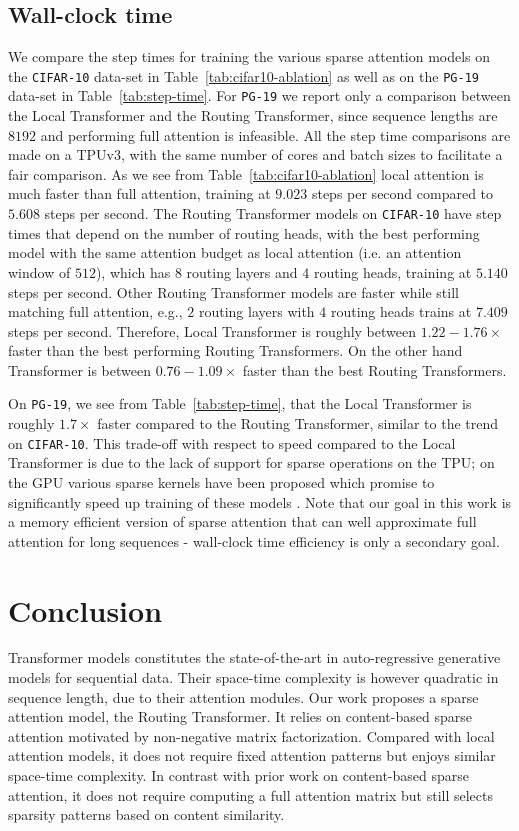 \subsection{Wall-clock time} We compare the step times for training the various sparse attention models on the \texttt{CIFAR-10} data-set in Table~\ref{tab:cifar10-ablation} as well as on the \texttt{PG-19} data-set in Table~\ref{tab:step-time}. For \texttt{PG-19}
we report only a comparison between the Local Transformer and the Routing Transformer, since sequence lengths are \(8192\) and performing full attention is infeasible. All the step time comparisons are made on a TPUv3, with the same number of cores and batch sizes to facilitate a fair comparison. As we see from Table~\ref{tab:cifar10-ablation} local attention is much faster than full attention, training at \(9.023\) steps per second compared to \(5.608\) steps per second. The Routing Transformer models on
\texttt{CIFAR-10} have step times that depend on the number of routing heads, with the best performing model with the same attention budget as local attention (i.e. an attention window of \(512\)), which has \(8\) routing layers and \(4\) routing heads, training at \(5.140\) steps per second. Other Routing Transformer models are faster while still matching full attention, e.g.,  \(2\) routing layers with \(4\) routing heads trains at \(7.409\) steps per second. Therefore, Local Transformer is roughly between \(1.22 - 1.76\times\) faster than the best performing Routing Transformers. On the other hand Transformer is between \(0.76 - 1.09\times\) faster than the best Routing Transformers.

On \texttt{PG-19}, we see from Table~\ref{tab:step-time}, that the Local Transformer is roughly \(1.7\times\) faster compared to the Routing Transformer, similar to the trend on \texttt{CIFAR-10}. 
This trade-off with respect to speed compared to the Local Transformer is due to the lack of support for sparse operations on the TPU; on the GPU various sparse kernels have been proposed which promise to significantly speed up training of these models \citep{gale2020sparse}. Note that our goal in this work is a memory efficient version of sparse attention that can well approximate full attention for long sequences - wall-clock time efficiency is only a secondary goal. 

\section{Conclusion}
Transformer models constitutes the state-of-the-art in auto-regressive generative models for sequential data. Their space-time complexity is however quadratic in sequence length, due to their attention modules. Our work proposes a sparse attention model, the Routing Transformer. It relies on content-based sparse attention motivated by non-negative matrix factorization. Compared with local attention models, it does not require fixed attention patterns but enjoys similar space-time complexity. In contrast with prior work on content-based sparse attention, it does not require computing a full attention matrix but still selects sparsity patterns based on content similarity.

